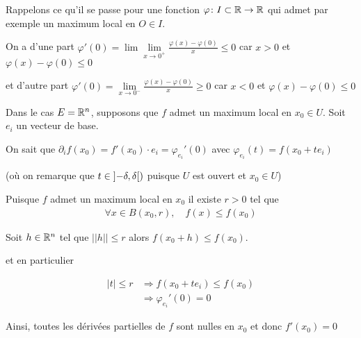 \documentclass[french,a4paper,10pt]{article}
\begin{document}
	\begin{myproof}
		Rappelons ce qu'il se passe pour une fonction $\varphi\colon I\subset \mathbb{R}\to\mathbb{R}$ qui admet par exemple un maximum local en $O\in I$.
		
		On a d'une part $\varphi'(0)=\lim\lim\limits_{x\to0^+}\frac{\varphi(x)-\varphi(0)}x\le 0$
		car $x>0$ et $\varphi(x)-\varphi(0)\le 0$
		
		et d'autre part $\varphi'(0)=\lim\limits_{x\to0^-}\frac{\varphi(x)-\varphi(0)}x\ge 0$ car $x<0$ et $\varphi(x)-\varphi(0)\le 0$
		
		Dans le cas $E=\mathbb{R}^n$, supposons que $f$ admet un maximum local en $x_0\in U$. Soit $e_i$ un vecteur de base.
		
		On sait que $\partial_i f(x_0)=f'(x_0)\cdot e_i=\varphi_{e_i}'(0)$ avec $\varphi_{e_i}(t)=f(x_0+te_i)$
		
		(où on remarque que $t\in\mathopen{]}-\delta,\delta\mathclose{[})$ puisque $U$ est ouvert et $x_0\in U$)
		
		Puisque $f$ admet un maximum local en $x_0$ il existe $r>0$ tel que
		\[\begin{aligned}
			\forall x\in B(x_0, r),\quad f(x)\le f(x_0)
		\end{aligned}\]
	
		Soit $h\in\mathbb{R}^n$ tel que $||h||\le r$ alors $f(x_0+h)\le f(x_0)$.
		
		et en particulier
		
		\[\begin{aligned}
			|t|\le r&\Longrightarrow f(x_0+t e_i)\le f(x_0)\\
			&\Longrightarrow\varphi_{e_i}'(0)=0
		\end{aligned}\]
	
		Ainsi, toutes les dérivées partielles de $f$ sont nulles en $x_0$ et donc $f'(x_0)=0$
		
	\end{myproof}
\end{document}
